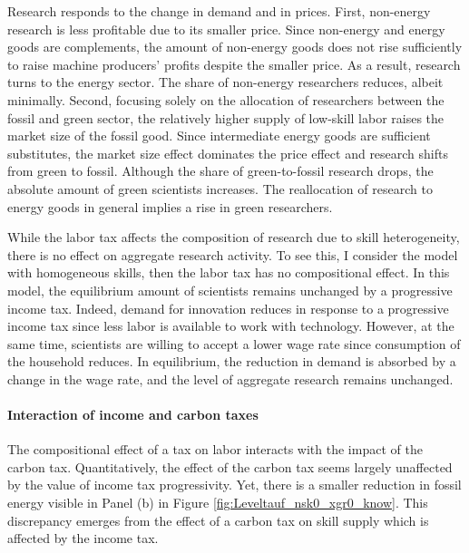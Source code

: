 Research responds to the change in demand and in prices. First, non-energy research is less profitable due to its smaller price. Since non-energy and energy goods are complements, the amount of non-energy goods does not rise sufficiently to raise machine producers' profits despite the smaller price. As a result, research turns to the energy sector. The share of non-energy researchers reduces, albeit minimally. %
Second, focusing solely on the allocation of researchers between the fossil and green sector, the relatively higher supply of low-skill labor raises the market size of the fossil good. Since intermediate energy goods are sufficient substitutes, the market size effect dominates the price effect and research shifts from green to fossil.
Although the share of green-to-fossil research drops, the absolute amount of green scientists increases. The reallocation of research to energy goods in general implies a rise in green researchers. 

While the labor tax affects the composition of research due to skill heterogeneity, there is no effect on aggregate research activity. 
To see this, I consider the model with homogeneous skills, then the labor tax has no compositional effect. In this model, the equilibrium amount of scientists remains unchanged by a progressive income tax. Indeed, demand for innovation reduces in response to a progressive income tax since less labor is available to work with technology. However, at the same time, scientists are willing to accept a lower wage rate since consumption of the household reduces. In equilibrium, the reduction in demand is absorbed by a change in the wage rate, and the level of aggregate research remains unchanged. 



\paragraph{Interaction of income and carbon taxes}
The compositional effect of a tax on labor interacts with the impact of the carbon tax.
Quantitatively, the effect of the carbon tax seems largely unaffected by the value of income tax progressivity.
Yet, there is a smaller reduction in fossil energy visible in Panel (b) in Figure \ref{fig:Leveltauf_nsk0_xgr0_know}.
This discrepancy emerges from the effect of a carbon tax on skill supply which is affected by the income tax. 


